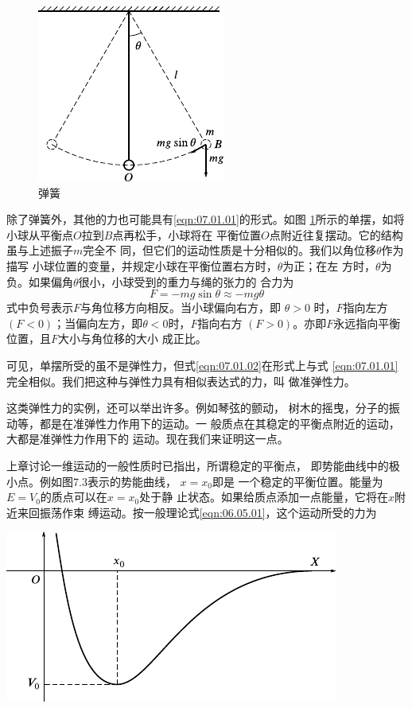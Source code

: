 \begin{figure}
  \centering
  \includegraphics{figure/fig07.02}
  \caption{弹簧}
  \label{fig:07.02}
\end{figure}
除了弹簧外，其他的力也可能具有\eqref{eqn:07.01.01}的形式。如图
\ref{fig:07.02}\;所示的单摆，如将小球从平衡点$ O $拉到$ B $点再松手，小球将在
平衡位置$ O $点附近往复摆动。它的结构虽与上述振子$ m $完全不
同，但它们的运动性质是十分相似的。我们以角位移$ \theta $作为描写
小球位置的变量，并规定小球在平衡位置右方时，$ \theta $为正；在左
方时，$ \theta $为负。如果偏角$ \theta $很小，小球受到的重力与绳的张力的
合力为
\begin{equation}\label{eqn:07.01.02}
  F = - m g \sin \theta \approx - m g \theta
\end{equation}
式中负号表示$ F $与角位移方向相反。当小球偏向右方，即 $ \theta > 0  $
时，$ F $指向左方$ \left( F < 0 \right) $；当偏向左方，即$  \theta < 0   $时，$ F $指向右方
$ \left( F > 0 \right) $。亦即$ F $永远指向平衡位置，且$ F $大小与角位移的大小
成正比。

可见，单摆所受的虽不是弹性力，但式\eqref{eqn:07.01.02}在形式上与式
\eqref{eqn:07.01.01}完全相似。我们把这种与弹性力具有相似表达式的力，叫
做准弹性力。

这类弹性力的实例，还可以举出许多。例如琴弦的颤动，
树木的摇曳，分子的振动等，都是在准弹性力作用下的运动。一
般质点在其稳定的平衡点附近的运动，大都是准弹性力作用下的
运动。现在我们来证明这一点。

上章讨论一维运动的一般性质时已指出，所谓稳定的平衡点，
即势能曲线中的极小点。例如图7.3表示的势能曲线， $ x = x _ { 0 }   $即是
一个稳定的平衡位置。能量为$ E = V _ 0 $的质点可以在$  x = x _ { 0 }   $处于静
止状态。如果给质点添加一点能量，它将在$ x $附近来回振荡作束
缚运动。按一般理论式\eqref{eqn:06.05.01}，这个运动所受的力为

\begin{figurex}
  \centering
  \includegraphics{figure/fig07.03}
  \caption{稳定的平衡状态}
  \label{fig:07.03}
\end{figurex}

